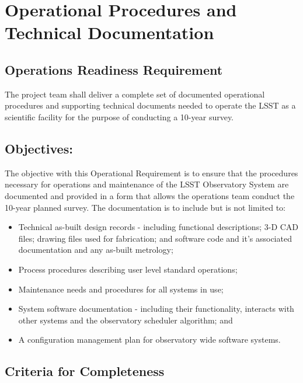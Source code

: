 \section{Operational Procedures and Technical Documentation} \label{sec:docs}

\subsection{Operations Readiness Requirement}

The project team shall deliver a complete set of documented operational procedures and supporting technical documents needed to operate the LSST as a scientific facility for the purpose of conducting a 10-year survey.

\subsection{Objectives:}

The objective with this Operational Requirement is to ensure that the procedures necessary for operations and maintenance of the LSST Observatory System are documented and provided in a form that allows the operations team conduct the 10-year planned survey.  The documentation is to include but is not limited to:

\begin{itemize}

	\item Technical as-built design records - including functional descriptions; 3-D CAD files; drawing files used for fabrication; and software code and it's associated documentation and any as-built metrology;
	\item Process procedures describing user level standard operations;
	\item Maintenance needs and procedures for all systems in use;
	\item System software documentation - including their functionality, interacts with other systems and the observatory scheduler algorithm; and
	\item A configuration management plan for observatory wide software systems.
	
\end{itemize}

\subsection{Criteria for Completeness}

